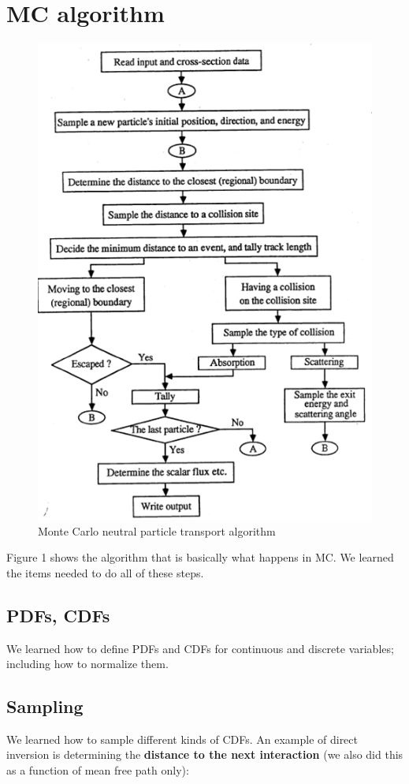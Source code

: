 \documentclass[12pt]{article}
\begin{document}
\section*{MC algorithm}
\begin{figure}[h]
\begin{center}
  \includegraphics[height=6 in,clip]{monte-carlo/MC-algorithm}
  \caption{Monte Carlo neutral particle transport algorithm}
  \end{center}
  \label{fig:mc-algo}
\end{figure}

Figure 1 shows the algorithm that is basically what happens in MC. We learned the items needed to do all of these steps.


\subsection*{PDFs, CDFs}
We learned how to define PDFs and CDFs for continuous and discrete variables; including how to normalize them. 

\subsection*{Sampling}
We learned how to sample different kinds of CDFs. An example of direct inversion is determining the \textbf{distance to the next interaction} (we also did this as a function of mean free path only):
\end{document}
